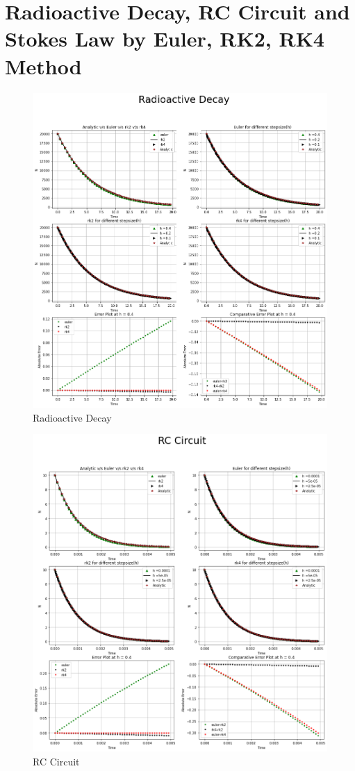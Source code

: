 \documentclass{article}
\begin{document}
\newpage
\section{Radioactive Decay, RC Circuit and Stokes Law by Euler, RK2, RK4 Method}

\newpage
\clearpage
\begin{figure}[h]
    \centering
    \includegraphics[width=14cm,height=12cm \textwidth]{Euler/radioactive.png}
\caption{Radioactive Decay}
\end{figure}
\newpage
\begin{figure}[h]
    \centering
    \includegraphics[width=14cm,height=12cm \textwidth]{Euler/rc.png}
\caption{RC Circuit}
\end{figure}
\end{document}
